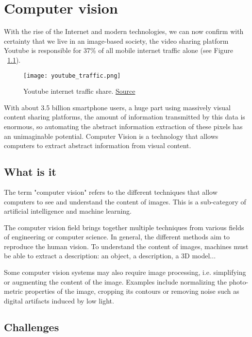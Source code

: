 \chapter{Computer vision}
With the rise of the Internet and modern technologies, we can now confirm with certainty that we live in an image-based society, the video sharing platform Youtube is responsible for 37\% of all mobile internet traffic alone (see Figure ~\ref{fig:youtube}).

\begin{figure}[H]
  \centering
  \texttt{[image: youtube\_traffic.png]}
  \caption{Youtube internet traffic share. \href{https://www.statista.com/chart/17321/global-downstream-mobile-traffic-by-app}{Source}}
  \label{fig:youtube}
\end{figure}

With about 3.5 billion smartphone users\cite{stats_smartphone_usage}, a huge part using massively visual content sharing platforms, the amount of information transmitted by this data is enormous, so automating the abstract information extraction of these pixels has an unimaginable potential.
Computer Vision is a technology that allows computers to extract abstract information from visual content.

\pagebreak\section{What is it}
The term "computer vision" refers to the different techniques that allow computers to see and understand the content of images. This is a sub-category of artificial intelligence and machine learning.

The computer vision field brings together multiple techniques from various fields of engineering or computer science. In general, the different methods aim to reproduce the human vision. To understand the content of images, machines must be able to extract a description: an object, a description, a 3D model...

Some computer vision systems may also require image processing, i.e. simplifying or augmenting the content of the image. Examples include normalizing the photo-metric properties of the image, cropping its contours or removing noise such as digital artifacts induced by low light.

\pagebreak\section{Challenges}

